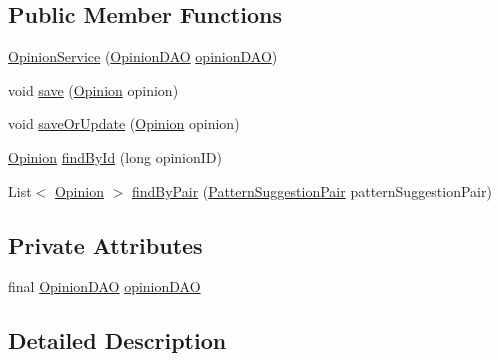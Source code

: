 \subsection*{Public Member Functions}
\begin{DoxyCompactItemize}
\item 
\hyperlink{classbr_1_1usp_1_1cata_1_1service_1_1_opinion_service_a71463f38bde2ff789d581e5506fe2cb7}{Opinion\+Service} (\hyperlink{classbr_1_1usp_1_1cata_1_1dao_1_1_opinion_d_a_o}{Opinion\+D\+A\+O} \hyperlink{classbr_1_1usp_1_1cata_1_1service_1_1_opinion_service_abdc571daedcdd5dba16c48305604d287}{opinion\+D\+A\+O})
\item 
void \hyperlink{classbr_1_1usp_1_1cata_1_1service_1_1_opinion_service_a18c84b1976f17b056a35591e0c99e73f}{save} (\hyperlink{classbr_1_1usp_1_1cata_1_1model_1_1_opinion}{Opinion} opinion)
\item 
void \hyperlink{classbr_1_1usp_1_1cata_1_1service_1_1_opinion_service_a990137f78a6a5f4f411386e8b1c447d5}{save\+Or\+Update} (\hyperlink{classbr_1_1usp_1_1cata_1_1model_1_1_opinion}{Opinion} opinion)
\item 
\hyperlink{classbr_1_1usp_1_1cata_1_1model_1_1_opinion}{Opinion} \hyperlink{classbr_1_1usp_1_1cata_1_1service_1_1_opinion_service_a1aac404942d237f97d9595097fd5184a}{find\+By\+Id} (long opinion\+I\+D)
\item 
List$<$ \hyperlink{classbr_1_1usp_1_1cata_1_1model_1_1_opinion}{Opinion} $>$ \hyperlink{classbr_1_1usp_1_1cata_1_1service_1_1_opinion_service_a0fe49b86ffd7c31e9097ec6757fd5e17}{find\+By\+Pair} (\hyperlink{classbr_1_1usp_1_1cata_1_1model_1_1_pattern_suggestion_pair}{Pattern\+Suggestion\+Pair} pattern\+Suggestion\+Pair)
\end{DoxyCompactItemize}
\subsection*{Private Attributes}
\begin{DoxyCompactItemize}
\item 
final \hyperlink{classbr_1_1usp_1_1cata_1_1dao_1_1_opinion_d_a_o}{Opinion\+D\+A\+O} \hyperlink{classbr_1_1usp_1_1cata_1_1service_1_1_opinion_service_abdc571daedcdd5dba16c48305604d287}{opinion\+D\+A\+O}
\end{DoxyCompactItemize}


\subsection{Detailed Description}


